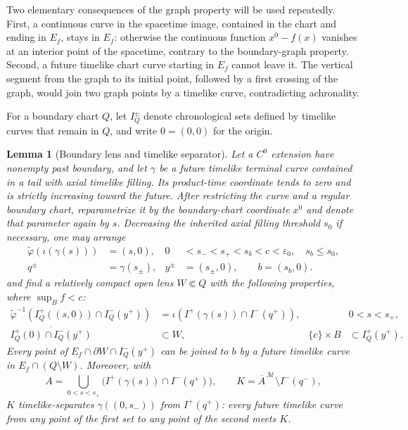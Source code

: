 \documentclass[10pt,a4paper]{article}
\numberwithin{equation}{section}
\newtheorem{lemma}[theorem]{Lemma}
\theoremstyle{definition}
\theoremstyle{remark}
\newcommand{\cM}{\mathcal M}
\newcommand{\eps}{\varepsilon}
\begin{document}
Two elementary consequences of the graph property will be used repeatedly.
First, a continuous curve in the spacetime image, contained in the chart
and ending in $E_f$, stays in $E_f$: otherwise the continuous function
$x^0-f(x)$ vanishes at an interior point of the spacetime, contrary to the
boundary-graph property.  Second, a future timelike chart curve starting
in $E_f$ cannot leave it.  The vertical segment from the graph to its
initial point, followed by a first crossing of the graph, would join two
graph points by a timelike curve, contradicting achronality.

For a boundary chart $Q$, let $I_Q^\pm$ denote chronological sets defined by
timelike curves that remain in $Q$, and write $0=(0,0)$ for the origin.

\begin{lemma}[Boundary lens and timelike separator]
\label{lem:boundary-lens}
Let a $C^0$ extension have nonempty past boundary, and let $\gamma$ be a
future timelike terminal curve contained in a tail with axial timelike
filling.  Its product-time coordinate tends to zero and is strictly
increasing toward the future.  After restricting the curve and a regular
boundary chart, reparametrize it by the boundary-chart coordinate $x^0$
and denote that parameter again by $s$.  Decreasing the inherited axial
filling threshold $s_0$ if necessary, one may arrange
\begin{equation}
 \begin{aligned}
 \widetilde\varphi(\iota(\gamma(s)))&=(s,0),&
 0&<s_-<s_+<s_b<c<\eps_0,\quad s_b\le s_0,\\
 q^\pm&=\gamma(s_\pm),&
 y^\pm&=(s_\pm,0),\qquad b=(s_b,0).
 \end{aligned}
 \label{eq:lens-axis-data}
\end{equation}
and find a relatively compact open lens $W\Subset Q$ with the following
properties, where $\sup_B f<c$:
\begin{align}
 \widetilde\varphi^{-1}\!\left(
 I_Q^+((s,0))\cap I_Q^-(y^+)\right)
 &=\iota\!\left(I^+(\gamma(s))\cap I^-(q^+)\right),
 &&0<s<s_+,
 \label{eq:local-global-diamond}\\
 \overline{I_Q^+(0)\cap I_Q^-(y^+)}&\subset W,&
 \{c\}\times B&\subset I_Q^+(y^+).
 \label{eq:lens-properties}
\end{align}
Every point of $E_f\cap\partial W\cap I_Q^-(y^+)$ can be joined to
$b$ by a future timelike curve in $E_f\cap(Q\setminus W)$.  Moreover, with
\begin{equation}
 A=\bigcup_{0<s<s_+}\bigl(I^+(\gamma(s))\cap I^-(q^+)\bigr),
 \qquad K=\overline A^{\,\cM}\setminus I^-(q^-),
 \label{eq:boundary-lens-separator}
\end{equation}
$K$ timelike-separates $\gamma((0,s_-))$ from $I^+(q^+)$: every future
timelike curve from any point of the first set to any point of the second
meets $K$.
\end{lemma}
\end{document}
